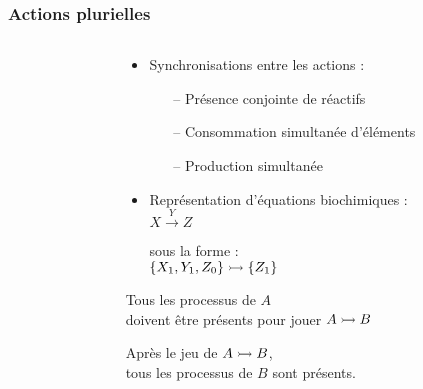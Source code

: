 
\begin{frame}[c]
  \frametitle{Actions plurielles}

\begin{columns}
\begin{column}{.4\textwidth}


\end{column}
\begin{column}{.55\textwidth}
\begin{center}

\begin{itemize}
  \item Synchronisations entre les actions :
  \begin{itemize}
    \item[--] Présence conjointe de réactifs
    \item[--] Consommation simultanée d'éléments
    \item[--] Production simultanée
  \end{itemize}
  \item Représentation d'équations biochimiques :\\
    \centering $X \xrightarrow{Y} Z$\\
    \raggedright sous la forme :\\
    \centering $\mbox{$\{X_1, Y_1, Z_0\} \rightarrowtail \{Z_1\}$}$
\end{itemize}

\vspace*{.5cm}


\vspace*{.5cm}
Tous les processus de $A$\\
doivent être présents pour jouer $\mbox{$A \rightarrowtail B$}$

\medskip
Après le jeu de $\mbox{$A \rightarrowtail B$}$,\\
tous les processus de $B$ sont présents.
% 
% 
% 

\end{center}
\end{column}
\end{columns}


\end{frame}
